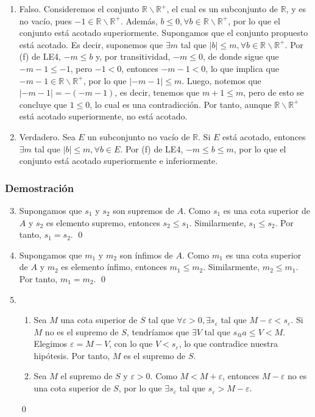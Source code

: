 \documentclass[11pt]{article}
\newcommand{\R}{\mathbb{R}}
\let\epsilon\varepsilon
\begin{document}
\begin{enumerate}[label=\arabic*.]
    \item Falso. Consideremos el conjunto $\R\backslash \R^+$, el cual es un subconjunto de $\R$, y es no vacío, pues $-1\in \R\backslash \R^+$. Además, $b\leq 0, \forall b\in \R\backslash\R^+$, por lo que el conjunto está acotado superiormente. Supongamos que el conjunto propuesto está acotado. Es decir, suponemos que $\exists m$ tal que $|b|\leq m, \forall b\in \R\backslash \R^+$. Por (f) de LE4, $-m \leq b$ y, por transitividad, $-m\leq 0$, de donde sigue que $-m-1\leq -1$, pero $-1<0$, entonces $-m-1<0$, lo que implica que $-m-1\in \R\backslash \R^+$, por lo que $|-m-1|\leq m$. Luego, notemos que $|-m-1|=-(-m-1)$, es decir, tenemos que $m+1\leq m$, pero de esto se concluye que $1\leq 0$, lo cual es una contradicción. Por tanto, aunque $\R\backslash \R^+$ está acotado superiormente, no está acotado.
    \item Verdadero. Sea $E$ un subconjunto no vacío de $\R$. Si $E$ está acotado, entonces $\exists m$ tal que $|b|\leq m,\forall b \in E$. Por (f) de LE4, $-m\leq b \leq m$, por lo que el conjunto está acotado superiormente e inferiormente.
\end{enumerate}

\subsubsection*{Demostración}

\begin{enumerate}[label=\arabic*.]\setcounter{enumi}{2}
    \item Supongamos que $s_1$ y $s_2$ son supremos de $A$. Como $s_1$ es una cota superior de $A$ y $s_2$ es elemento supremo, entonces $s_2\leq s_1$. Similarmente, $s_1\leq s_2$. Por tanto, $s_1=s_2$. \qed
    \item Supongamos que $m_1$ y $m_2$ son ínfimos de $A$. Como $m_1$ es una cota superior de $A$ y $m_2$ es elemento ínfimo, entonces $m_1\leq m_2$. Similarmente, $m_2\leq m_1$. Por tanto, $m_1=m_2$. \qed
    \item \begin{enumerate}[label=\roman*)]
        \item Sea $M$ una cota superior de $S$ tal que $\forall \epsilon>0, \exists s_{\epsilon}$ tal que $M-\epsilon<s_{\epsilon}$. Si $M$ no es el supremo de $S$, tendríamos que $\exists V$ tal que $s_@a \leq V < M$. Elegimos $\epsilon = M-V$, con lo que $V<s_{\epsilon}$, lo que contradice nuestra hipótesis. Por tanto, $M$ es el supremo de $S$.
        \item Sea $M$ el supremo de $S$ y $\epsilon>0$. Como $M<M+\epsilon$, entonces $M-\epsilon$ no es una cota superior de $S$, por lo que $\exists s_\epsilon$ tal que $s_\epsilon>M-\epsilon$.
        \end{enumerate}
        \qed
\end{enumerate}
\end{document}
